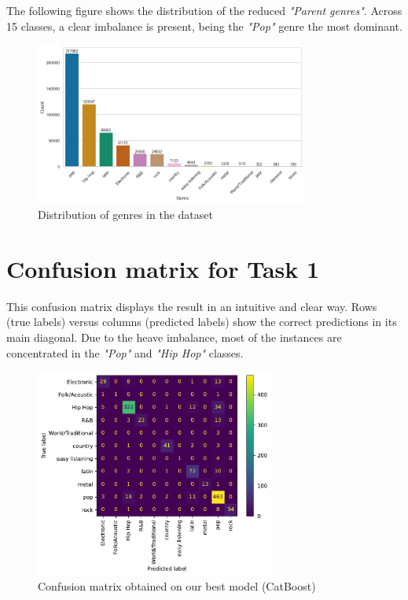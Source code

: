 \documentclass{article}
\begin{document}
The following figure shows the distribution of the reduced \textit{"Parent genres"}. Across 15 classes, a clear imbalance is present, being the \textit{"Pop"} genre the most dominant.
\begin{figure}[h!]
    \centering
    \includegraphics[width=0.8\textwidth]{genre_distribution.png}
    \caption{Distribution of genres in the dataset}
    \label{fig:genre_distribution}
\end{figure}

\section{Confusion matrix for Task 1}
\label{appendix:confusion_matrix}

This confusion matrix displays the result in an intuitive and clear way. Rows (true labels) versus columns (predicted labels) show the correct predictions in its main diagonal. Due to the heave imbalance, most of the instances are concentrated in the \textit{"Pop"} and \textit{"Hip Hop"} classes.

\begin{figure}[h!]
    \centering
    \includegraphics[width=0.7\textwidth]{CatBoost_confusion_matrix.pdf}
    \caption{Confusion matrix obtained on our best model (CatBoost)}
    \label{fig:confusion_matrix}
\end{figure}
\end{document}
